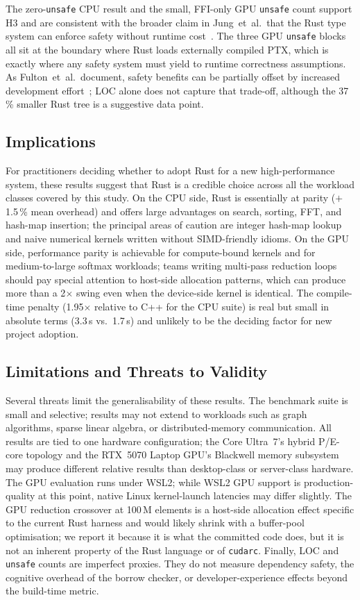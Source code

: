 \documentclass{article}
\begin{document}
The zero-\texttt{unsafe} CPU result and the small, FFI-only GPU
\texttt{unsafe} count support H3 and are consistent with the broader
claim in Jung~et~al.\ that the Rust type system can enforce safety
without runtime cost~\cite{jung2017rustbelt}.
The three GPU \texttt{unsafe} blocks all sit at the boundary where Rust
loads externally compiled PTX, which is exactly where any safety system
must yield to runtime correctness assumptions.
As Fulton~et~al.\ document, safety benefits can be partially offset by
increased development effort~\cite{fulton2021benefits}; LOC alone does
not capture that trade-off, although the 37\,\% smaller Rust tree is a
suggestive data point.

\subsection{Implications}

For practitioners deciding whether to adopt Rust for a new
high-performance system, these results suggest that Rust is a credible
choice across all the workload classes covered by this study.
On the CPU side, Rust is essentially at parity ($+$1.5\,\% mean
overhead) and offers large advantages on search, sorting, FFT, and
hash-map insertion; the principal areas of caution are integer
hash-map lookup and naive numerical kernels written without
SIMD-friendly idioms.
On the GPU side, performance parity is achievable for compute-bound
kernels and for medium-to-large softmax workloads; teams writing
multi-pass reduction loops should pay special attention to host-side
allocation patterns, which can produce more than a 2$\times$ swing
even when the device-side kernel is identical.
The compile-time penalty (1.95$\times$ relative to C++ for the CPU
suite) is real but small in absolute terms (3.3\,s vs.\ 1.7\,s) and
unlikely to be the deciding factor for new project adoption.

\subsection{Limitations and Threats to Validity}

Several threats limit the generalisability of these results.
The benchmark suite is small and selective; results may not extend to
workloads such as graph algorithms, sparse linear algebra, or
distributed-memory communication.
All results are tied to one hardware configuration; the Core Ultra~7's
hybrid P/E-core topology and the RTX~5070 Laptop GPU's Blackwell memory
subsystem may produce different relative results than desktop-class or
server-class hardware.
The GPU evaluation runs under WSL2; while WSL2 GPU support is
production-quality at this point, native Linux kernel-launch latencies
may differ slightly.
The GPU reduction crossover at 100\,M elements is a host-side
allocation effect specific to the current Rust harness and would
likely shrink with a buffer-pool optimisation; we report it because it
is what the committed code does, but it is not an inherent property of
the Rust language or of \texttt{cudarc}.
Finally, LOC and \texttt{unsafe} counts are imperfect proxies.
They do not measure dependency safety, the cognitive overhead of the
borrow checker, or developer-experience effects beyond the build-time
metric.
\end{document}
